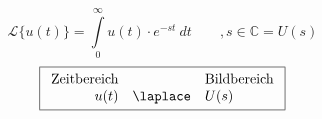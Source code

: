 \[ \boxed{\mathcal{L} \lbrace u(t) \rbrace 
= \int\limits_{0}^{\infty} u(t) \cdot e^{-st} ~ dt \qquad , s \in \mathbb{C} 
= U(s)} \]
\[ \boxed{\begin{array}{rcl}
\text{Zeitbereich} &  & \text{Bildbereich} \\
u(t) & \laplace & U(s)
\end{array}} \]

